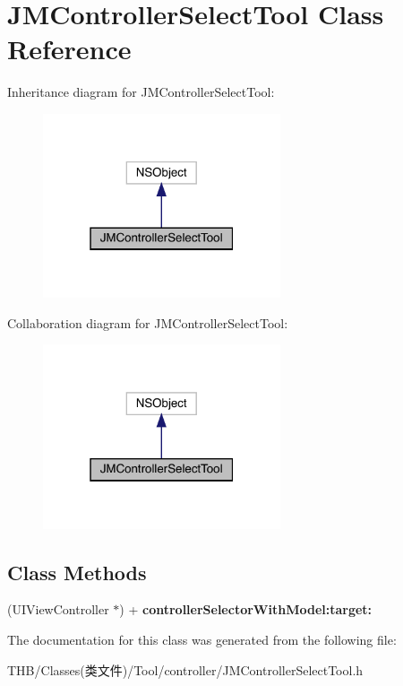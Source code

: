 \hypertarget{interface_j_m_controller_select_tool}{}\section{J\+M\+Controller\+Select\+Tool Class Reference}
\label{interface_j_m_controller_select_tool}


Inheritance diagram for J\+M\+Controller\+Select\+Tool\+:\nopagebreak
\begin{figure}[H]
\begin{center}
\leavevmode
\includegraphics[width=199pt]{interface_j_m_controller_select_tool__inherit__graph}
\end{center}
\end{figure}


Collaboration diagram for J\+M\+Controller\+Select\+Tool\+:\nopagebreak
\begin{figure}[H]
\begin{center}
\leavevmode
\includegraphics[width=199pt]{interface_j_m_controller_select_tool__coll__graph}
\end{center}
\end{figure}
\subsection*{Class Methods}
\begin{DoxyCompactItemize}
\item 
\mbox{\label{interface_j_m_controller_select_tool_a8ebc251c01c78b7d08fd84ec12ee2e43}} 
(U\+I\+View\+Controller $\ast$) + {\bfseries controller\+Selector\+With\+Model\+:target\+:}
\end{DoxyCompactItemize}


The documentation for this class was generated from the following file\+:\begin{DoxyCompactItemize}
\item 
T\+H\+B/\+Classes(类文件)/\+Tool/controller/J\+M\+Controller\+Select\+Tool.\+h\end{DoxyCompactItemize}
